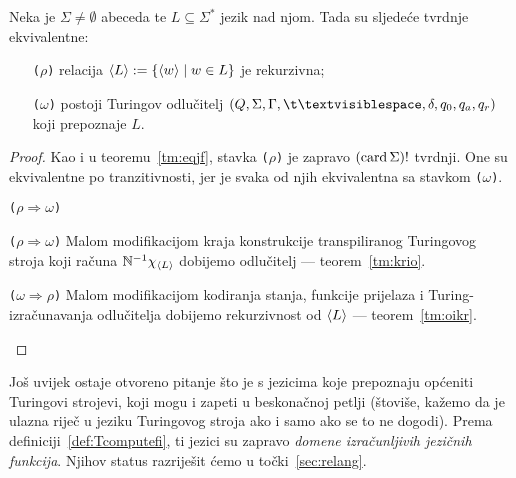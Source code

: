 \begin{teorem}\label{tm:eqj}
Neka je $\Sigma\ne\emptyset$ abeceda te $L\subseteq\Sigma^*$ jezik nad njom. Tada su sljedeće tvrdnje ekvivalentne:
\begin{itemize}
	\item[\texttt{\textup{($\rho$)}}] relacija $\langle L\rangle:=\{\langle w\rangle\mid w\in L\}$ je rekurzivna;
    \item[\texttt{\textup{($\omega$)}}] postoji Turingov odlučitelj $(Q,\Sigma,\Gamma,\bl,\delta,q_0,q_a,q_r)$ koji prepoznaje $L$.
\end{itemize}
\end{teorem}
\begin{proof}
	Kao i u teoremu~\ref{tm:eqjf}, stavka \texttt{($\rho$)} je zapravo $(\operatorname{card}\Sigma)!$ tvrdnji. One su ekvivalentne po tranzitivnosti, jer je svaka od njih ekvivalentna sa stavkom \texttt{($\omega$)}.
\begin{labeling}{\texttt{($\rho\Rightarrow\omega$)}}
\item[\texttt{($\rho\Rightarrow\omega$)}] Malom modifikacijom kraja konstrukcije transpiliranog Turingovog stro\-ja koji računa ${\mathbb N}^{-1}\chi_{\langle L\rangle}$ dobijemo odlučitelj --- teorem~\ref{tm:krio}.
\item[\texttt{($\omega\Rightarrow\rho$)}] Malom modifikacijom kodiranja stanja, funkcije prijelaza i Turing-iz\-ra\-ču\-na\-va\-nja odlučitelja dobijemo rekurzivnost od $\langle L\rangle$ --- teorem~\ref{tm:oikr}.\qedhere
\end{labeling}
\end{proof}

Još uvijek ostaje otvoreno pitanje što je s jezicima koje prepoznaju općeniti Turingovi strojevi, koji mogu i zapeti u beskonačnoj petlji (štoviše, kažemo da je ulazna riječ u jeziku Turingovog stroja ako i samo ako se to ne dogodi). Prema definiciji~\ref{def:Tcomputefi}, ti jezici su zapravo \emph{domene izračunljivih jezičnih funkcija}. Njihov status razriješit ćemo u točki~\ref{sec:relang}.

